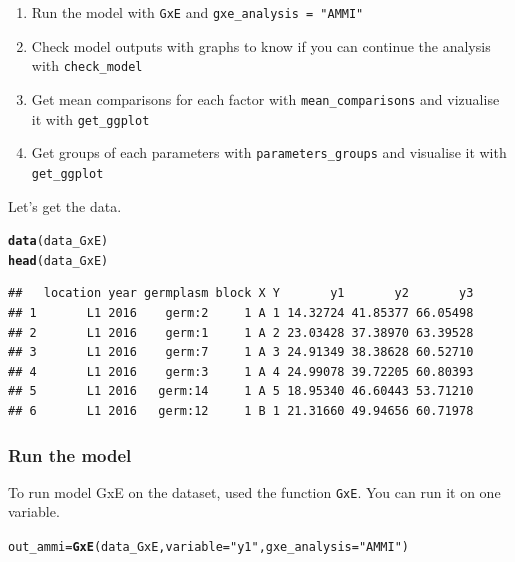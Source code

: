 \documentclass{book}\usepackage[]{graphicx}\usepackage[]{color}
\makeatletter
\newcommand{\hlstr}[1]{\textcolor[rgb]{0.192,0.494,0.8}{#1}}%
\newcommand{\hlstd}[1]{\textcolor[rgb]{0.345,0.345,0.345}{#1}}%
\newcommand{\hlkwb}[1]{\textcolor[rgb]{0.69,0.353,0.396}{#1}}%
\newcommand{\hlkwc}[1]{\textcolor[rgb]{0.333,0.667,0.333}{#1}}%
\newcommand{\hlkwd}[1]{\textcolor[rgb]{0.737,0.353,0.396}{\textbf{#1}}}%
\newenvironment{kframe}{%
 \def\at@end@of@kframe{}%
 \ifinner\ifhmode%
  \def\at@end@of@kframe{\end{minipage}}%
  \begin{minipage}{\columnwidth}%
 \fi\fi%
 \def\FrameCommand##1{\hskip\@totalleftmargin \hskip-\fboxsep
 \colorbox{shadecolor}{##1}\hskip-\fboxsep
     \hskip-\linewidth \hskip-\@totalleftmargin \hskip\columnwidth}%
 \MakeFramed {\advance\hsize-\width
   \@totalleftmargin\z@ \linewidth\hsize
   \@setminipage}}%
 {\par\unskip\endMakeFramed%
 \at@end@of@kframe}
\newenvironment{knitrout}{}{} %
\makeatother
\begin{document}
\begin{enumerate}
\item Run the model with \texttt{GxE} and \texttt{gxe\_analysis = "AMMI"}
\item Check model outputs with graphs to know if you can continue the analysis with \texttt{check\_model}
\item Get mean comparisons for each factor with \texttt{mean\_comparisons} and vizualise it with \texttt{get\_ggplot}
\item Get groups of each parameters with \texttt{parameters\_groups} and visualise it with \texttt{get\_ggplot}
\end{enumerate}

Let's get the data.

\begin{knitrout}
\color{fgcolor}\begin{kframe}
\begin{alltt}
\hlkwd{data}\hlstd{(data_GxE)}
\hlkwd{head}\hlstd{(data_GxE)}
\end{alltt}
\begin{verbatim}
##   location year germplasm block X Y       y1       y2       y3
## 1       L1 2016    germ:2     1 A 1 14.32724 41.85377 66.05498
## 2       L1 2016    germ:1     1 A 2 23.03428 37.38970 63.39528
## 3       L1 2016    germ:7     1 A 3 24.91349 38.38628 60.52710
## 4       L1 2016    germ:3     1 A 4 24.99078 39.72205 60.80393
## 5       L1 2016   germ:14     1 A 5 18.95340 46.60443 53.71210
## 6       L1 2016   germ:12     1 B 1 21.31660 49.94656 60.71978
\end{verbatim}
\end{kframe}
\end{knitrout}


\subsubsection{Run the model}
To run model GxE on the dataset, used the function \texttt{GxE}.
You can run it on one variable.

\begin{knitrout}
\color{fgcolor}\begin{kframe}
\begin{alltt}
\hlstd{out_ammi} \hlkwb{=} \hlkwd{GxE}\hlstd{(data_GxE,} \hlkwc{variable} \hlstd{=} \hlstr{"y1"}\hlstd{,} \hlkwc{gxe_analysis} \hlstd{=} \hlstr{"AMMI"}\hlstd{)}
\end{alltt}


{\ttfamily\noindent\itshape\color{messagecolor}{\#\# AMMI model done for y1}}\end{kframe}
\end{knitrout}
\end{document}
